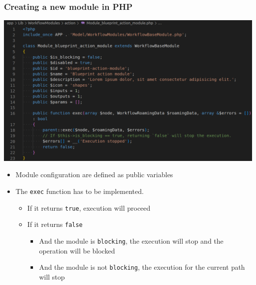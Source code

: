 \begin{frame}
    \frametitle{Creating a new module in PHP}
    \begin{center}
        \includegraphics[width=0.65\linewidth]{pictures/custom-1.png}
    \end{center}

    \begin{itemize}
        \item Module configuration are defined as public variables
        \item The \texttt{exec} function has to be implemented.
        \begin{itemize}
            \item If it returns \texttt{true}, execution will proceed
            \item If it returns \texttt{false}
            \begin{itemize}
                \item And the module is \texttt{blocking}, the execution will stop and the operation will be blocked
                \item And the module is not \texttt{blocking}, the execution for the current path will stop
            \end{itemize}
        \end{itemize}
    \end{itemize}
\end{frame}


